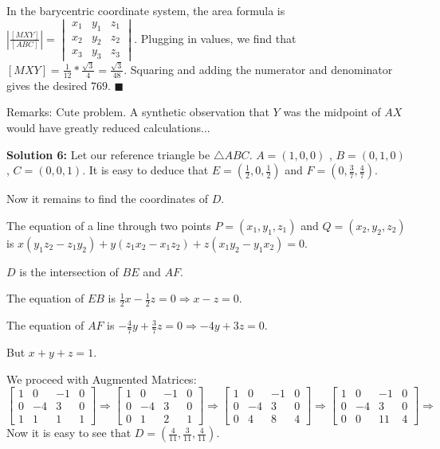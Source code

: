\documentclass{article}
\begin{document}
In the barycentric coordinate system, the area formula is $|\frac{[MXY]}{[ABC]}|=\begin{vmatrix}
x_{1} &y_{1}  &z_{1} \\ 
x_{2} &y_{2}  &z_{2} \\ 
 x_{3}& y_{3} & z_{3}
\end{vmatrix}$. Plugging in values, we find that $[MXY]=\frac {1}{12}*\frac {\sqrt 3}{4}=\frac{\sqrt3}{48}$. Squaring and adding the numerator and denominator gives the desired $769$. $\blacksquare$

Remarks: Cute problem. A synthetic observation that $Y$ was the midpoint of $AX$ would have greatly reduced calculations...
\vspace{.2in}


\textbf{Solution 6:}
Let our reference triangle be $\triangle ABC$. $A=(1,0,0)$ , $B=(0,1,0)$, $C=(0,0,1)$. It is easy to deduce that $E=(\frac 12,0,\frac 12)$ and $F=(0, \frac 37, \frac 47)$.

Now it remains to find the coordinates of $D$. 

The equation of a line through two points $P=(x_1,y_1,z_1)$ and $Q=(x_2,y_2,z_2)$ is $x(y_1z_2 -z_1y_2)+y(z_1x_2-x_1z_2)+z(x_1y_2-y_1x_2)=0$.

$D$ is the intersection of $BE$ and $AF$.

The equation of $EB$ is $\frac 12 x-\frac 12 z=0\Rightarrow x-z=0$.

The equation of $AF$ is $-\frac 47 y+\frac 37 z=0\Rightarrow -4y+3z=0$.

But $x+y+z=1$. 

We proceed with Augmented Matrices: $$ \begin{bmatrix}
1 & 0 & -1 &0\\
0& -4 & 3 &0\\
1&1&1&1
\end{bmatrix}\Rightarrow \begin{bmatrix}
1 & 0 & -1 &0\\
0& -4 & 3 &0\\
0&1&2&1
\end{bmatrix}\Rightarrow\begin{bmatrix}
1 & 0 & -1 &0\\
0& -4 & 3 &0\\
0&4&8&4
\end{bmatrix}\Rightarrow\begin{bmatrix}
1 & 0 & -1 &0\\
0& -4 & 3 &0\\
0&0&11&4
\end{bmatrix}\Rightarrow$$ Now it is easy to see that $D=(\frac {4}{11}, \frac{3}{11},\frac {4}{11})$.
\end{document}
